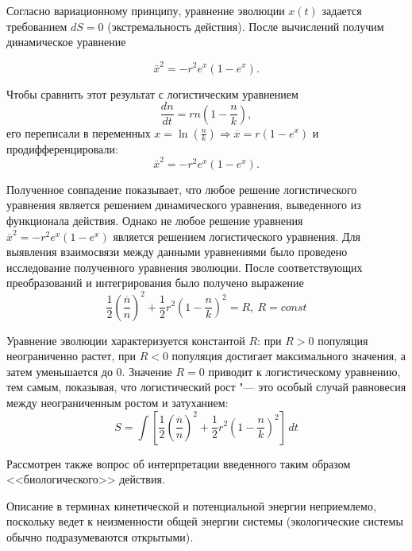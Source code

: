 \documentclass[12pt,a4paper,oneside]{book}
\begin{document}
Согласно вариационному принципу, уравнение эволюции $x(t)$ задается требованием $dS=0$ (экстремальность действия). После вычислений получим динамическое уравнение

\begin{equation}
	\overset{..}{x}^2=-r^2e^x(1-e^x).
\end{equation}

Чтобы сравнить этот результат с логистическим уравнением 
\begin{equation}
	\frac{dn}{dt}=rn\left( 1- \frac{n}{k} \right),
\end{equation}
его переписали в переменных $x=\ln \left( \frac{n}{k} \right) \Rightarrow \overset{.}{x}=r(1-e^x)$ и продифференцировали: 
\begin{equation}
	\overset{..}{x}^2=-r^2e^x(1-e^x).
\end{equation}

Полученное совпадение показывает, что любое решение логистического уравнения является решением динамического уравнения, выведенного из функционала действия. Однако не любое решение уравнения $\overset{..}{x}^2=-r^2e^x(1-e^x)$ является решением логистического уравнения. Для выявления взаимосвязи между данными уравнениями было проведено исследование полученного уравнения эволюции. После соответствующих преобразований и интегрирования было получено выражение
\begin{equation}
	\frac{1}{2} \left( \frac{\overset{.}{n}}{n} \right)^2 +
		\frac{1}{2} r^2 \left(1 - \frac{n}{k} \right)^2 = R, \ R=const
\end{equation}
 
Уравнение эволюции характеризуется константой $R$: при $R > 0$ популяция неограниченно растет, при $R < 0$ популяция достигает максимального значения, а затем уменьшается до 0. Значение $R = 0$ приводит к логистическому уравнению, тем самым, показывая, что логистический рост "--- это особый случай равновесия между неограниченным ростом и затуханием:
\begin{equation}
S=\int \left[ \frac{1}{2} \left( \frac{\overset{.}{n}}{n} \right)^2+ \frac{1}{2} r^2 \left( 1- \frac{n}{k} \right)^2 \right] \,dt
\end{equation}
 
Рассмотрен также вопрос об интерпретации введенного таким образом <<биологического>> действия. 

Описание в терминах кинетической и потенциальной энергии неприемлемо, поскольку ведет к неизменности общей энергии системы (экологические системы обычно подразумеваются открытыми). 
\end{document}
